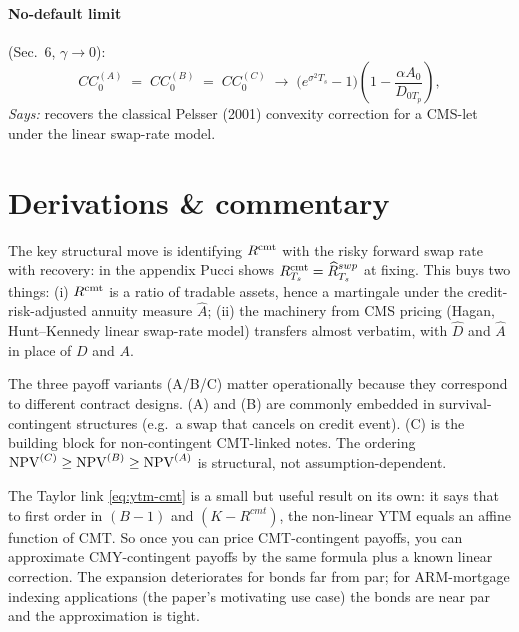 \documentclass[11pt,a4paper]{article}
\begin{document}
\paragraph{No-default limit} (Sec.\ 6, $\gamma \to 0$):
\begin{equation}\label{eq:no-default-limit}
  CC^{(A)}_0 \;=\; CC^{(B)}_0 \;=\; CC^{(C)}_0
  \;\longrightarrow\; \bigl(e^{\sigma^2 T_s} - 1\bigr)\left(1 - \frac{\alpha A_0}{D_{0 T_p}}\right),
\end{equation}
\textit{Says:} recovers the classical Pelsser (2001) convexity
correction for a CMS-let under the linear swap-rate model.

\section{Derivations \& commentary}

\begin{commentary}
The key structural move is identifying $R^{\mathrm{cmt}}$ with the risky forward
swap rate with recovery: in the appendix Pucci shows
$R^{\mathrm{cmt}}_{T_s} = \widehat R^{swp}_{T_s}$ at fixing. This buys two things:
(i) $R^{\mathrm{cmt}}$ is a ratio of tradable assets, hence a martingale under
the credit-risk-adjusted annuity measure $\widehat A$; (ii) the
machinery from CMS pricing (Hagan, Hunt--Kennedy linear swap-rate
model) transfers almost verbatim, with $\widehat D$ and $\widehat A$
in place of $D$ and $A$.
\end{commentary}

\begin{commentary}
The three payoff variants (A/B/C) matter operationally because they
correspond to different contract designs. (A) and (B) are commonly
embedded in survival-contingent structures (e.g.\ a swap that
cancels on credit event). (C) is the building block for
non-contingent CMT-linked notes. The ordering $\mathrm{NPV}^{(C)} \ge
\mathrm{NPV}^{(B)} \ge \mathrm{NPV}^{(A)}$ is structural, not assumption-dependent.
\end{commentary}

\begin{commentary}
The Taylor link \eqref{eq:ytm-cmt} is a small but useful result on its
own: it says that to first order in $(B-1)$ and $(K - R^{cmt})$, the
non-linear YTM equals an affine function of CMT. So once you can price
CMT-contingent payoffs, you can approximate CMY-contingent payoffs by
the same formula plus a known linear correction. The expansion
deteriorates for bonds far from par; for ARM-mortgage indexing
applications (the paper's motivating use case) the bonds are near par
and the approximation is tight.
\end{commentary}
\end{document}
